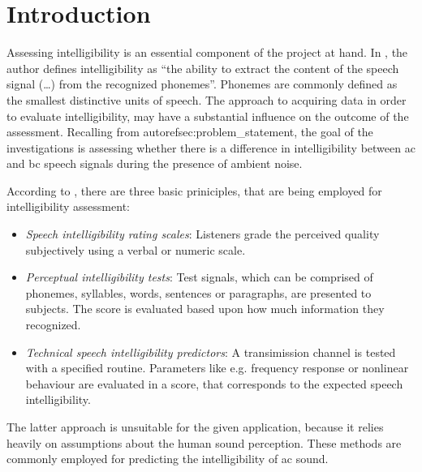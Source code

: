 \section{Introduction}
Assessing intelligibility is an essential component of the project at hand. 
In \citep[p. 11]{cote_2011}, the author defines intelligibility as \enquote{the ability to extract the content of the speech signal (\dots) from the recognized phonemes}. Phonemes are commonly defined as the smallest distinctive units of speech.
The approach to acquiring data in order to evaluate intelligibility, may have a substantial influence on the outcome of the assessment.
Recalling from autorefsec:problem_statement, the goal of the investigations is assessing whether there is a difference in intelligibility between \gls{ac} and \gls{bc} speech signals during the presence of ambient noise. 

According to \citep{arl_us_army}, there are three basic priniciples, that are being employed for intelligibility assessment:
\begin{itemize}
\item \textit{Speech intelligibility rating scales}: Listeners grade the perceived quality subjectively using a verbal or numeric scale.
\item \textit{Perceptual intelligibility tests}:  Test signals, which can be comprised of phonemes, syllables, words, sentences or paragraphs, are presented to subjects. The score is evaluated based upon how much information they recognized.
\item \textit{Technical speech intelligibility predictors}: A transimission channel is tested with a specified routine. Parameters like e.g. frequency response or nonlinear behaviour are evaluated in a score, that corresponds to the expected speech intelligibility.
\end{itemize}
The latter approach is unsuitable for the given application, because it relies heavily on assumptions about the human sound perception. These methods are commonly employed for predicting the intelligibility of \gls{ac} sound.